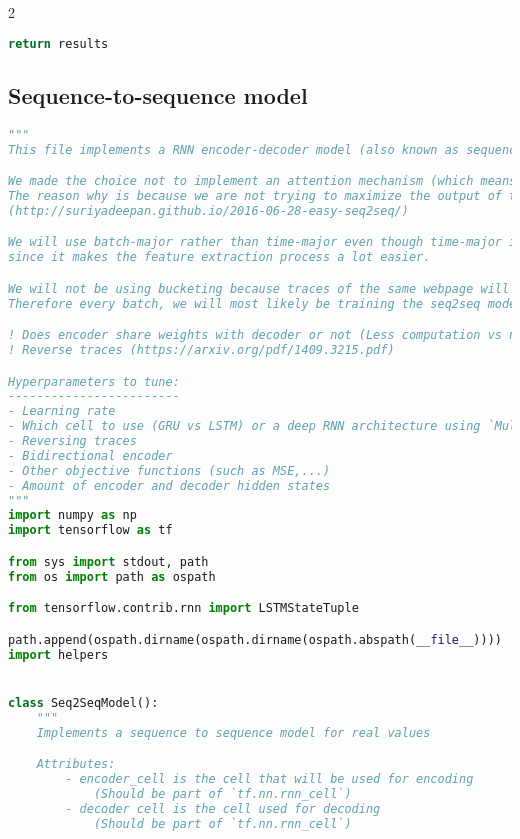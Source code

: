 \begin{landscape}
\begin{multicols}{2}
\begin{lstlisting}[language=Python]
    return results

\end{lstlisting}

\subsection{Sequence-to-sequence model}

\begin{lstlisting}[language=Python]
"""
This file implements a RNN encoder-decoder model (also known as sequence-to-sequence models).

We made the choice not to implement an attention mechanism (which means that the decoder is allowed to have a 'peak' at the input).
The reason why is because we are not trying to maximize the output of the decoder but instead the feature selection process.
(http://suriyadeepan.github.io/2016-06-28-easy-seq2seq/)

We will use batch-major rather than time-major even though time-major is slightly more efficient
since it makes the feature extraction process a lot easier.

We will not be using bucketing because traces of the same webpage will have the same length.
Therefore every batch, we will most likely be training the seq2seq model on one webpage

! Does encoder share weights with decoder or not (Less computation vs natural (https://arxiv.org/pdf/1409.3215.pdf))
! Reverse traces (https://arxiv.org/pdf/1409.3215.pdf)

Hyperparameters to tune:
------------------------
- Learning rate
- Which cell to use (GRU vs LSTM) or a deep RNN architecture using `MultiRNNCell`
- Reversing traces
- Bidirectional encoder
- Other objective functions (such as MSE,...)
- Amount of encoder and decoder hidden states
"""
import numpy as np
import tensorflow as tf

from sys import stdout, path
from os import path as ospath

from tensorflow.contrib.rnn import LSTMStateTuple

path.append(ospath.dirname(ospath.dirname(ospath.abspath(__file__))))
import helpers


class Seq2SeqModel():
    """
    Implements a sequence to sequence model for real values

    Attributes:
        - encoder_cell is the cell that will be used for encoding
            (Should be part of `tf.nn.rnn_cell`)
        - decoder cell is the cell used for decoding
            (Should be part of `tf.nn.rnn_cell`)


\end{lstlisting}
\end{multicols}
\end{landscape}
